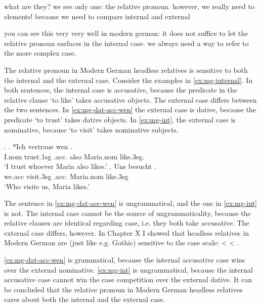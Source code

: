 what are they? we see only one: the relative pronoun. however, we really need to elements! because we need to compare internal and external

you can see this very very well in modern german: it does not suffice to let the relative pronoun surfaces in the internal case. we always need a way to refer to the more complex case.



The relative pronoun in Modern German headless relatives is sensitive to both the internal and the external case. Consider the examples in \ref{ex:mg-internal}. In both sentences, the internal case is accusative, because the predicate in the relative clause  `to like' takes accusative objects. The external case differs between the two sentences. In \ref{ex:mg-dat-acc-wen} the external case is dative, because the predicate  `to trust' takes dative objects.  In \ref{ex:mg-int}, the external case is nominative, because  `to visit' takes nominative subjects.

\ex.\label{ex:mg-internal}
\ag. *Ich vertraue wen   . \\
I.\ac{nom} trust.1\ac{sg}\scsub{[dat]} .\ac{acc}. also Maria.\ac{nom} like.3\ac{sg}\scsub{[acc]}.\\
`I trust whoever Maria also likes.' \label{ex:mg-dat-acc-wen}
\bg. Uns besucht   .\\
 we.\ac{acc} visit.3\ac{sg}\scsub{[nom]} .\ac{acc}. Maria.\ac{nom} like.3\ac{sg}\scsub{[acc]}\\
 `Who visits us, Maria likes.' \label{ex:mg-int-rep}

The sentence in \ref{ex:mg-dat-acc-wen} is ungrammatical, and the one in \ref{ex:mg-int} is not. The internal case cannot be the source of ungrammaticality, because the relative clauses are identical regarding case, i.e. they both take accusative. The external case differs, however. In Chapter X I showed that headless relatives in Modern German are (just like e.g. Gothic) sensitive to the case scale:  <  < .

\ref{ex:mg-dat-acc-wen} is grammatical, because the internal accusative case wins over the external nominative. \ref{ex:mg-int} is ungrammatical, because the internal accusative case cannot win the case competition over the external dative. It can be concluded that the relative pronoun in Modern German headless relatives cares about both the internal and the external case.


